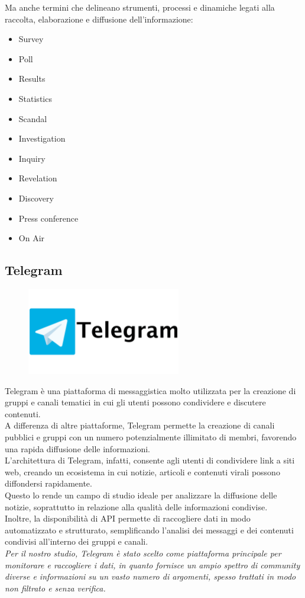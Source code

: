 \documentclass[12pt]{article}
\begin{document}
	Ma anche termini che delineano strumenti, processi e dinamiche legati alla raccolta, elaborazione e diffusione dell’informazione:
	\begin{itemize}[label=] 
		\item Survey
		\item Poll
		\item Results
		\item Statistics
		\item Scandal
		\item Investigation
		\item Inquiry
		\item Revelation
		\item Discovery
		\item Press conference
		\item On Air
	\end{itemize}
	\subsection{Telegram}
	\begin{figure}[H]
		\centering
		\includegraphics[width=0.6\textwidth]{immagini/telegram}
	\end{figure}
	Telegram è una piattaforma di messaggistica molto utilizzata per la creazione di gruppi e canali tematici in cui gli utenti possono condividere e discutere contenuti.\\
	A differenza di altre piattaforme, Telegram permette la creazione di canali pubblici e gruppi con un numero potenzialmente illimitato di membri, favorendo una rapida diffusione delle informazioni. \\L'architettura di Telegram, infatti, consente agli utenti di condividere link a siti web, creando un ecosistema in cui notizie, articoli e contenuti virali possono diffondersi rapidamente. \\Questo lo rende un campo di studio ideale per analizzare la diffusione delle notizie, soprattutto in relazione alla qualità delle informazioni condivise. \\Inoltre, la disponibilità di API permette di raccogliere dati in modo automatizzato e strutturato, semplificando l'analisi dei messaggi e dei contenuti condivisi all'interno dei gruppi e canali. \\\textit{Per il nostro studio, Telegram è stato scelto come piattaforma principale per monitorare e raccogliere i dati, in quanto fornisce un ampio spettro di community diverse e informazioni su un vasto numero di argomenti, spesso trattati in modo non filtrato e senza verifica.}
\end{document}
